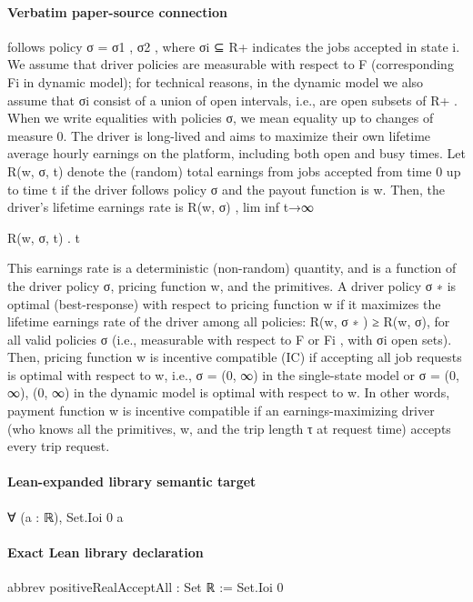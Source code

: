\documentclass[10pt]{article}
\begin{document}
\paragraph{Verbatim paper-source connection}
\begin{ReviewVerbatim}
follows policy σ = {σ1 , σ2 }, where σi ⊆ R+ indicates the jobs accepted in state i. We assume that
driver policies are measurable with respect to F (corresponding Fi in dynamic model); for technical
reasons, in the dynamic model we also assume that σi consist of a union of open intervals, i.e., are
open subsets of R+ . When we write equalities with policies σ, we mean equality up to changes of
measure 0.
The driver is long-lived and aims to maximize their own lifetime average hourly earnings on the
platform, including both open and busy times. Let R(w, σ, t) denote the (random) total earnings
from jobs accepted from time 0 up to time t if the driver follows policy σ and the payout function
is w. Then, the driver’s lifetime earnings rate is
R(w, σ) , lim inf t→∞

R(w, σ, t)
.
t

This earnings rate is a deterministic (non-random) quantity, and is a function of the driver policy
σ, pricing function w, and the primitives.
A driver policy σ ∗ is optimal (best-response) with respect to pricing function w if it maximizes
the lifetime earnings rate of the driver among all policies: R(w, σ ∗ ) ≥ R(w, σ), for all valid policies
σ (i.e., measurable with respect to F or Fi , with σi open sets). Then, pricing function w is incentive
compatible (IC) if accepting all job requests is optimal with respect to w, i.e., σ = (0, ∞) in
the single-state model or σ = {(0, ∞), (0, ∞)} in the dynamic model is optimal with respect to w.
In other words, payment function w is incentive compatible if an earnings-maximizing driver (who
knows all the primitives, w, and the trip length τ at request time) accepts every trip request.
\end{ReviewVerbatim}

\paragraph{Lean-expanded library semantic target}
\begin{ReviewVerbatim}
∀ (a : ℝ), Set.Ioi 0 a
\end{ReviewVerbatim}

\paragraph{Exact Lean library declaration}
\begin{ReviewVerbatim}
abbrev positiveRealAcceptAll : Set ℝ :=
  Set.Ioi 0
\end{ReviewVerbatim}
\end{document}
